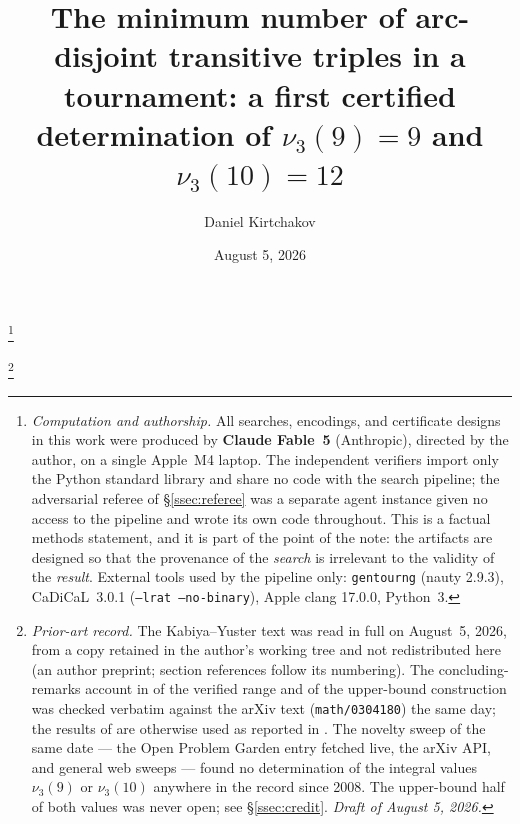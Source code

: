 \documentclass[11pt]{amsart}
\newcommand{\nut}{\nu_3}
\theoremstyle{plain}
\theoremstyle{definition}
\theoremstyle{remark}
\begin{document}
\title[Certified values of $\nut(9)$ and $\nut(10)$]{The minimum number of
arc-disjoint transitive triples in a tournament: a first certified
determination of $\nut(9)=9$ and $\nut(10)=12$}

\author{Daniel Kirtchakov}
\address{Independent researcher (\texttt{05oz}); no institutional
affiliation.}

\thanks{\emph{Computation and authorship.} All searches, encodings, and
certificate designs in this work were produced by \textbf{Claude Fable~5}
(Anthropic), directed by the author, on a single Apple~M4 laptop. The
independent verifiers import only the Python standard library and share no
code with the search pipeline; the adversarial referee of
\S\ref{ssec:referee} was a separate agent instance given no access to the
pipeline and wrote its own code throughout. This is a factual methods
statement, and it is part of the point of the note: the artifacts are
designed so that the provenance of the \emph{search} is irrelevant to the
validity of the \emph{result}. External tools used by the pipeline only:
\texttt{gentourng} (nauty 2.9.3), CaDiCaL~3.0.1
(\texttt{--lrat --no-binary}), Apple clang 17.0.0, Python~3.}

\thanks{\emph{Prior-art record.} The Kabiya--Yuster text \cite{KY08} was
read in full on August~5, 2026, from a copy retained in the author's working
tree and not redistributed here (an
author preprint; section references follow its numbering). The
concluding-remarks account in \cite{Yuster04} of the verified range and of
the upper-bound construction was checked verbatim against the arXiv text
(\texttt{math/0304180}) the same day; the results of \cite{Yuster04} are
otherwise used as reported in \cite{KY08}. The novelty sweep of the same
date --- the Open Problem Garden entry fetched live, the arXiv API, and
general web sweeps --- found no determination of the integral values
$\nut(9)$ or $\nut(10)$ anywhere in the record since 2008. The upper-bound
half of both values was never open; see \S\ref{ssec:credit}. \emph{Draft
of August 5, 2026.}}


\date{August 5, 2026}
\end{document}
